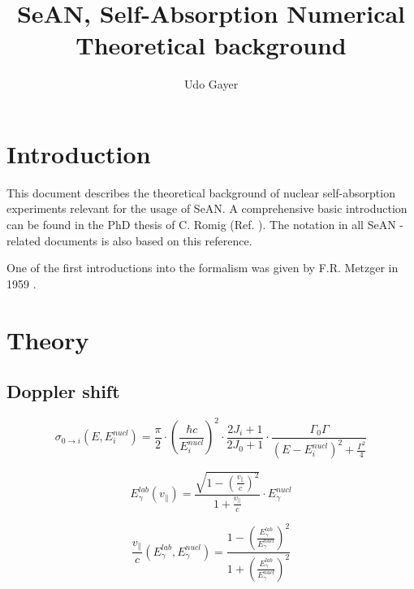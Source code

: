 \documentclass{article}
\begin{document}
\title{SeAN, Self-Absorption Numerical \\ Theoretical background}
\author{Udo Gayer}
\date{}
\maketitle

\newpage

\tableofcontents

\newpage

\section{Introduction}
This document describes the theoretical background of nuclear self-absorption experiments relevant for the usage of SeAN. 
A comprehensive basic introduction can be found in the PhD thesis of C. Romig (Ref. \cite{Rom15}).
The notation in all SeAN - related documents is also based on this reference.

One of the first introductions into the formalism was given by F.R. Metzger in 1959 \cite{Met59}.

\newpage

\section{Theory}
\subsection{Doppler shift}

\begin{equation}
\label{breit_wigner}
\sigma_{0 \to i} (E, E_i^{nucl}) = \frac{\pi}{2} \cdot \left( \frac{\hbar c}{E_i^{nucl}} \right)^2 \cdot \frac{2 J_i + 1}{2 J_0 + 1} \cdot \frac{\Gamma_0 \Gamma}{\left( E - E_i^{nucl} \right)^2 + \frac{\Gamma^2}{4}}
\end{equation}

\begin{equation}
\label{doppler_shift}
E_\gamma^{lab}(v_\parallel) = \frac{\sqrt{1 - \left( \frac{v_\parallel}{c} \right)^2}}{1 + \frac{v_\parallel}{c}} \cdot E_\gamma^{nucl}
\end{equation}

\begin{equation}
\label{doppler_shift_inverse}
\frac{v_\parallel}{c} \left( E_\gamma^{lab}, E_\gamma^{nucl} \right) = \frac{1 - \left( \frac{E_\gamma^{lab}}{E_\gamma^{nucl}} \right)^2}{1 + \left( \frac{E_\gamma^{lab}}{E_\gamma^{nucl}} \right)^2}
\end{equation}
\end{document}
